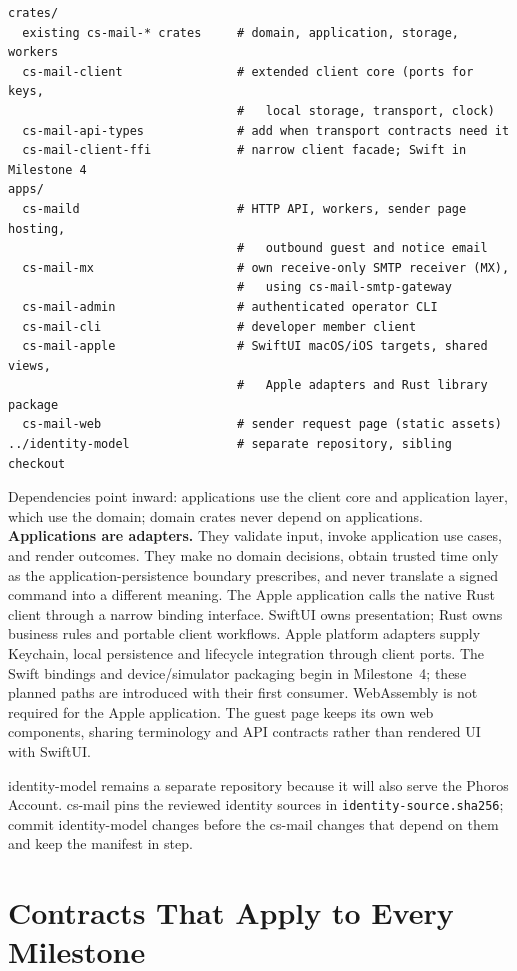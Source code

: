\documentclass[11pt]{article}
\begin{document}
\begin{lstlisting}
crates/
  existing cs-mail-* crates     # domain, application, storage, workers
  cs-mail-client                # extended client core (ports for keys,
                                #   local storage, transport, clock)
  cs-mail-api-types             # add when transport contracts need it
  cs-mail-client-ffi            # narrow client facade; Swift in Milestone 4
apps/
  cs-maild                      # HTTP API, workers, sender page hosting,
                                #   outbound guest and notice email
  cs-mail-mx                    # own receive-only SMTP receiver (MX),
                                #   using cs-mail-smtp-gateway
  cs-mail-admin                 # authenticated operator CLI
  cs-mail-cli                   # developer member client
  cs-mail-apple                 # SwiftUI macOS/iOS targets, shared views,
                                #   Apple adapters and Rust library package
  cs-mail-web                   # sender request page (static assets)
../identity-model               # separate repository, sibling checkout
\end{lstlisting}

Dependencies point inward: applications use the client core and application
layer, which use the domain; domain crates never depend on applications.
\textbf{Applications are adapters.} They validate input, invoke application use
cases, and render outcomes. They make no domain decisions, obtain trusted time
only as the application-persistence boundary prescribes, and never translate a
signed command into a different meaning. The Apple application calls the native
Rust client through a narrow binding interface. SwiftUI owns presentation; Rust
owns business rules and portable client workflows. Apple platform adapters supply
Keychain, local persistence and lifecycle integration through client ports. The
Swift bindings and device/simulator packaging begin in Milestone~4; these planned
paths are introduced with their first consumer. WebAssembly is not required for
the Apple application. The guest page keeps its own web components, sharing
terminology and API contracts rather than rendered UI with SwiftUI.

identity-model remains a separate repository because it will also serve the
Phoros Account. cs-mail pins the reviewed identity sources in
\texttt{identity-source.sha256}; commit identity-model changes before the cs-mail
changes that depend on them and keep the manifest in step.

\section{Contracts That Apply to Every Milestone}
\end{document}
